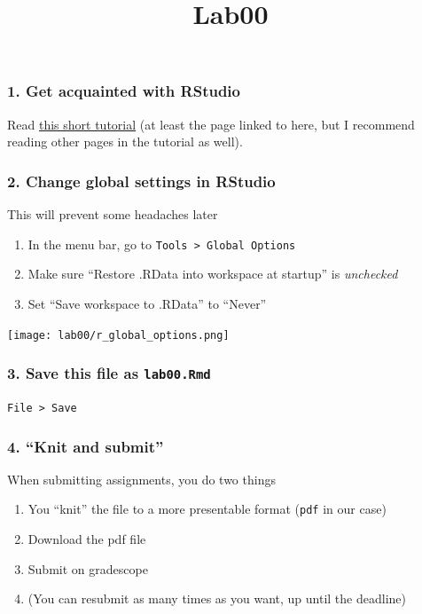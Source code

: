 \documentclass[
]{article}
\title{Lab00}
\author{}
\date{\vspace{-2.5em}}
\providecommand{\tightlist}{%
  \setlength{\itemsep}{0pt}\setlength{\parskip}{0pt}}
\begin{document}
\maketitle

\subsubsection{1. Get acquainted with
RStudio}\label{get-acquainted-with-rstudio}

Read
\href{https://www.gastonsanchez.com/R-ice-breaker/1-07-rstudio-tour.html}{this
short tutorial} (at least the page linked to here, but I recommend
reading other pages in the tutorial as well).

\subsubsection{2. Change global settings in
RStudio}\label{change-global-settings-in-rstudio}

This will prevent some headaches later

\begin{enumerate}
\def\labelenumi{\arabic{enumi}.}
\tightlist
\item
  In the menu bar, go to \texttt{Tools\ \textgreater{}\ Global\ Options}
\item
  Make sure ``Restore .RData into workspace at startup'' is
  \emph{unchecked}
\item
  Set ``Save workspace to .RData'' to ``Never''
\end{enumerate}

\texttt{[image: lab00/r\_global\_options.png]}

\subsubsection{\texorpdfstring{3. Save this file as
\texttt{lab00.Rmd}}{3. Save this file as lab00.Rmd}}\label{save-this-file-as-lab00.rmd}

\texttt{File\ \textgreater{}\ Save}

\subsubsection{4. ``Knit and submit''}\label{knit-and-submit}

When submitting assignments, you do two things

\begin{enumerate}
\def\labelenumi{\arabic{enumi}.}
\tightlist
\item
  You ``knit'' the file to a more presentable format (\texttt{pdf} in
  our case)
\item
  Download the pdf file
\item
  Submit on gradescope
\item
  (You can resubmit as many times as you want, up until the deadline)
\end{enumerate}
\end{document}
